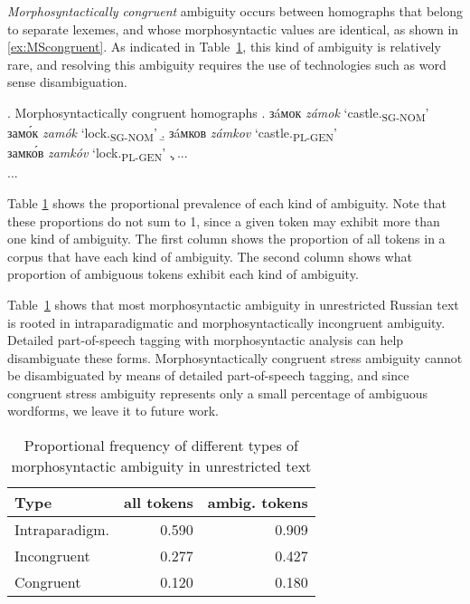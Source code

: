 \documentclass[11pt]{article}
\newcommand{\rus}[1]{\foreignlanguage{russian}{#1}}
\begin{document}
\emph{Morphosyntactically congruent} ambiguity occurs between homographs 
that belong to separate lexemes, and whose morphosyntactic values are identical, 
as shown in \ref{ex:MScongruent}. As indicated in Table~\ref{table:ambiguity}, 
this kind of ambiguity is relatively rare, and resolving this ambiguity requires 
the use of technologies such as word sense disambiguation.

\ex. Morphosyntactically congruent homographs \label{ex:MScongruent}
\a. \rus{з\'{a}мок} \emph{z\'{a}mok} `castle.\textsubscript{SG-NOM}'\\
	\rus{зам\'{о}к} \emph{zam\'{o}k} `lock.\textsubscript{SG-NOM}'
\b. \rus{з\'{a}мков} \emph{z\'{a}mkov} `castle.\textsubscript{PL-GEN}'\\
	\rus{замк\'{о}в} \emph{zamk\'{o}v} `lock.\textsubscript{PL-GEN}'
\c. ...\\
	...

Table \ref{table:ambiguity} shows the proportional prevalence of each kind of 
ambiguity. Note that these proportions do not sum to 1, since a given token may 
exhibit more than one kind of ambiguity. The first column shows the proportion 
of all tokens in a corpus that have each kind of ambiguity. The second column 
shows what proportion of ambiguous tokens exhibit each kind of ambiguity.

Table~\ref{table:ambiguity} shows that most morphosyntactic ambiguity in 
unrestricted Russian text is rooted in intraparadigmatic and morphosyntactically 
incongruent ambiguity. Detailed part-of-speech tagging with morphosyntactic 
analysis can help disambiguate these forms. Morphosyntactically congruent stress 
ambiguity cannot be disambiguated by means of detailed part-of-speech tagging, 
and since congruent stress ambiguity represents only a small percentage of 
ambiguous wordforms, we leave it to future work.

\begin{table}
  \centering
  \begin{tabular}{l|rr}
    \hline
    \textbf{Type}  & \textbf{all tokens} & \textbf{ambig. tokens} \\
    \hline
    Intraparadigm. & 0.590                   & 0.909   \\
    Incongruent    & 0.277                   & 0.427   \\ 
    Congruent      & 0.120                   & 0.180    \\ 
    \hline
  \end{tabular}
  \caption{Proportional frequency of different types of morphosyntactic ambiguity in unrestricted text}
  \label{table:ambiguity}
\end{table}
\end{document}
